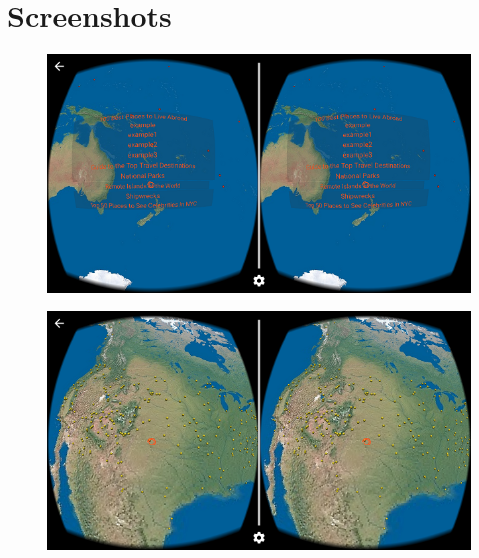 \label{appendix-screenshots}
\chapter{Screenshots}

\begin{figure}[H]
	\centering
	\includegraphics[width=\linewidth, keepaspectratio]{Figures/Screenshots/kml-chooser.png}
	\decoRule
\end{figure}

\begin{figure}[H]
	\centering
	\includegraphics[width=\linewidth, keepaspectratio]{Figures/Screenshots/ray-spinner.png}
	\decoRule
\end{figure}

